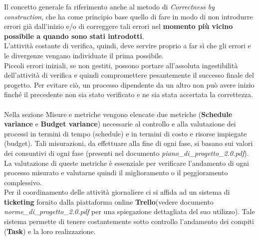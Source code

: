 \documentclass[a4paper,11pt]{article}
\begin{document}
Il concetto generale fa riferimento anche al metodo di \textit{Correctness by construction}, che ha come principio base quello di fare in modo di non introdurre errori già dall'inizio e/o di correggere tali errori nel \textbf{momento più vicino possibile a quando sono stati introdotti}.\\ L'attività costante di verifica, quindi,  deve servire proprio a far sì che gli errori e le divergenze vengano individuate il prima possibile.\\
Piccoli errori iniziali, se non gestiti, possono portare all'assoluta ingestibilità dell'attività di verifica e quindi compromettere pesantemente il successo finale del progetto. Per evitare ciò, un processo dipendente da un altro non può avere inizio finché il precedente non sia stato verificato e ne sia stata accertata la correttezza.\\\\ %
Nella sezione Misure e metriche vengono elencate due metriche (\textbf{Schedule variance} e \textbf{Budget variance}) necessarie al controllo e alla valutazione dei processi in termini di tempo (schedule) e in termini di costo e risorse impiegate (budget). 
Tali misurazioni, da effettuare alla fine di ogni fase, si basano sui valori dei consuntivi di ogni fase (presenti nel documento \textit{piano\_di\_progetto\_2.0.pdf}). La valutazione di queste metriche è essenziale per verificare l'andamento di ogni processo misurato e valutarne quindi il miglioramento o il peggioramento complessivo. \\
Per il coordinamento delle attività giornaliere ci si affida ad un sistema di \textbf{ticketing\addglos} fornito dalla piattaforma online \textbf{Trello}\addglos (vedere documento \textit{norme\_di\_progetto\_2.0.pdf} per una spiegazione dettagliata del suo utilizzo). Tale sistema permette di tenere costantemente sotto controllo l'andamento dei compiti (\textbf{Task}\addglos) e la loro realizzazione. 
\end{document}
